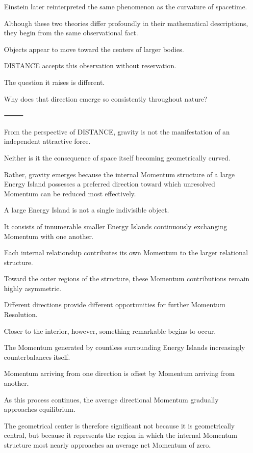 Einstein later reinterpreted the same phenomenon as the curvature of spacetime.

Although these two theories differ profoundly in their mathematical descriptions, they begin from the same observational fact.

Objects appear to move toward the centers of larger bodies.

DISTANCE accepts this observation without reservation.

The question it raises is different.

Why does that direction emerge so consistently throughout nature?

⸻

From the perspective of DISTANCE, gravity is not the manifestation of an independent attractive force.

Neither is it the consequence of space itself becoming geometrically curved.

Rather, gravity emerges because the internal Momentum structure of a large Energy Island possesses a preferred direction toward which unresolved Momentum can be reduced most effectively.

A large Energy Island is not a single indivisible object.

It consists of innumerable smaller Energy Islands continuously exchanging Momentum with one another.

Each internal relationship contributes its own Momentum to the larger relational structure.

Toward the outer regions of the structure, these Momentum contributions remain highly asymmetric.

Different directions provide different opportunities for further Momentum Resolution.

Closer to the interior, however, something remarkable begins to occur.

The Momentum generated by countless surrounding Energy Islands increasingly counterbalances itself.

Momentum arriving from one direction is offset by Momentum arriving from another.

As this process continues, the average directional Momentum gradually approaches equilibrium.

The geometrical center is therefore significant not because it is geometrically central, but because it represents the region in which the internal Momentum structure most nearly approaches an average net Momentum of zero.

